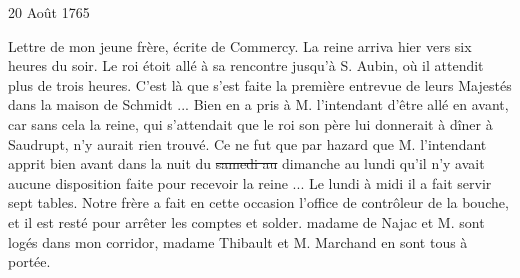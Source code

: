                      \begin{diary}{20 Août 1765}{}
                        
                         Lettre de mon jeune frère, écrite de Commercy. \og 
                              La reine arriva
                              hier vers six heures du
                              soir. Le roi étoit
                              allé à sa rencontre jusqu'à
                              S. Aubin, où il attendit
                              plus de trois heures.
                              C'est là que s'est faite la première entrevue
                              de leurs Majestés dans la maison de Schmidt ...
                              Bien en a pris à M.
                                 l'intendant d'être allé
                              en avant, car sans cela la reine, qui s'attendait
                              que le roi son père
                              lui donnerait à dîner à
                              Saudrupt, n'y aurait
                              rien trouvé. Ce ne fut
                              que par hazard que M.
                                 l'intendant
                              apprit
                              bien avant dans la nuit du \sout{samedi au}
                              dimanche au lundi qu'il n'y avait
                              aucune disposition
                              faite pour recevoir la
                                 reine ... Le lundi
                              à midi il a fait servir sept tables. Notre
                                 frère a fait en cette occasion l'office de
                              contrôleur de la bouche, et
                              il est resté pour
                              arrêter les comptes et solder. madame de Najac
                              et M. sont logés dans mon
                              corridor, madame
                                 Thibault et M. Marchand en sont tous
                              à portée.  \fg{}
                        \bigskip
        
        
                     \end{diary}
                     
